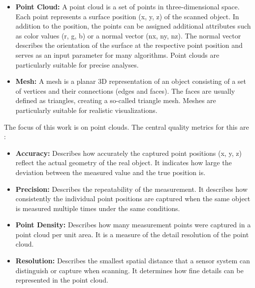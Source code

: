 \begin{English}
    \begin{itemize}
        \item \textbf{Point Cloud:} A point cloud is a set of points in three-dimensional space. Each point represents a surface position (x, y, z) of the scanned object. In addition to the position, the points can be assigned additional attributes such as color values (r, g, b) or a normal vector (nx, ny, nz). The normal vector describes the orientation of the surface at the respective point position and serves as an input parameter for many algorithms. Point clouds are particularly suitable for precise analyses.
        \item \textbf{Mesh:} A mesh is a planar 3D representation of an object consisting of a set of vertices and their connections (edges and faces). The faces are usually defined as triangles, creating a so-called triangle mesh. Meshes are particularly suitable for realistic visualizations.
    \end{itemize}

    The focus of this work is on point clouds. The central quality metrics for this are \cite{rashdiScanningTechnologiesBuilding2022}:

    \begin{itemize}
        \item \textbf{Accuracy:} Describes how accurately the captured point positions (x, y, z) reflect the actual geometry of the real object. It indicates how large the deviation between the measured value and the true position is.
        \item \textbf{Precision:} Describes the repeatability of the measurement. It describes how consistently the individual point positions are captured when the same object is measured multiple times under the same conditions.
        \item \textbf{Point Density:} Describes how many measurement points were captured in a point cloud per unit area. It is a measure of the detail resolution of the point cloud.
        \item \textbf{Resolution:} Describes the smallest spatial distance that a sensor system can distinguish or capture when scanning. It determines how fine details can be represented in the point cloud.
    \end{itemize}
\end{English}


